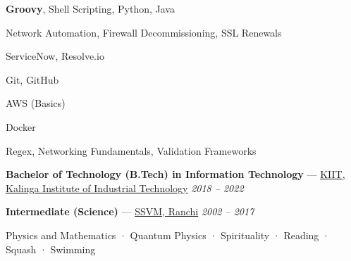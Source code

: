 \documentclass[11pt, a4paper]{awesome-cv}
\begin{document}
\vspace{-2.0em}
\begin{cventries}
\small
\cventry
  {
    \begin{description}[
      labelwidth=2.0cm,
      leftmargin=2.5cm,
      align=right,
      labelsep=1em,
      itemsep=-0.2em
    ]
      \item[Languages :] \textbf{Groovy}, Shell Scripting, Python, Java
      \item[Automation :] Network Automation, Firewall Decommissioning, SSL Renewals
      \item[Platforms :] ServiceNow, Resolve.io
      \item[Dev Tools :] Git, GitHub
      \item[Cloud :] AWS (Basics)
      \item[Containers :] Docker
      \item[Other :] Regex, Networking Fundamentals, Validation Frameworks
    \end{description}
  }
  {}
  {}
  {}
  {}
\end{cventries}

\vspace{-2.5em}

\begin{cventries}
\vspace{-1.5em}
\cventry
  {}
  {}
  {}
  {}
  {
    \begin{cvitems}
      \item {\textbf{Bachelor of Technology (B.Tech) in Information Technology} — \underline{KIIT, Kalinga Institute of Industrial Technology} \hfill \textit{2018 – 2022}}
      \item {\textbf{Intermediate (Science)} — \underline{SSVM, Ranchi} \hfill \textit{2002 – 2017}}
    \end{cvitems}
  }

\end{cventries}


\begin{cvparagraph}
Physics and Mathematics · Quantum Physics · Spirituality · Reading · Squash · Swimming
\end{cvparagraph}
\end{document}
